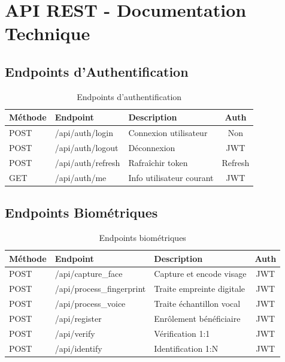 \documentclass[12pt,a4paper]{report}
\begin{document}
\section{API REST - Documentation Technique}

\subsection{Endpoints d'Authentification}

\begin{table}[H]
    \centering
    \caption{Endpoints d'authentification}
    \label{tab:api-auth}
    \begin{tabular}{|l|l|p{5cm}|c|}
        \hline
        \textbf{Méthode} & \textbf{Endpoint} & \textbf{Description} & \textbf{Auth} \\
        \hline
        POST & /api/auth/login & Connexion utilisateur & Non \\
        \hline
        POST & /api/auth/logout & Déconnexion & JWT \\
        \hline
        POST & /api/auth/refresh & Rafraîchir token & Refresh \\
        \hline
        GET & /api/auth/me & Info utilisateur courant & JWT \\
        \hline
    \end{tabular}
\end{table}

\subsection{Endpoints Biométriques}

\begin{table}[H]
    \centering
    \caption{Endpoints biométriques}
    \label{tab:api-bio}
    \begin{tabular}{|l|l|p{5cm}|c|}
        \hline
        \textbf{Méthode} & \textbf{Endpoint} & \textbf{Description} & \textbf{Auth} \\
        \hline
        POST & /api/capture\_face & Capture et encode visage & JWT \\
        \hline
        POST & /api/process\_fingerprint & Traite empreinte digitale & JWT \\
        \hline
        POST & /api/process\_voice & Traite échantillon vocal & JWT \\
        \hline
        POST & /api/register & Enrôlement bénéficiaire & JWT \\
        \hline
        POST & /api/verify & Vérification 1:1 & JWT \\
        \hline
        POST & /api/identify & Identification 1:N & JWT \\
        \hline
    \end{tabular}
\end{table}
\end{document}

